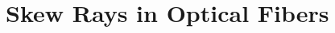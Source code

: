 \documentclass[a4paper,twocolumn,superscriptaddress]{revtex4-1}
\begin{document}
{%

\section{Skew Rays in Optical Fibers} 
\label{sec:skewrays}

%
%





}
\end{document}
